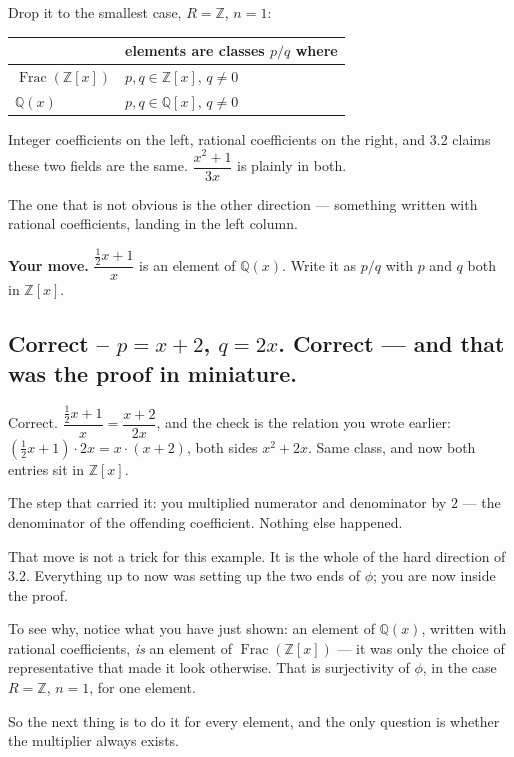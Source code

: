 \documentclass[11pt]{article}
\begin{document}
Drop it to the smallest case, $R = \mathbb{Z}$, $n = 1$:

\begin{center}\begin{tabular}{ll}\hline
\textbf{} & \textbf{elements are classes $p/q$ where} \\ \hline
$\operatorname{Frac}(\mathbb{Z}[x])$ & $p, q \in \mathbb{Z}[x]$, $q \neq 0$ \\
$\mathbb{Q}(x)$ & $p, q \in \mathbb{Q}[x]$, $q \neq 0$ \\
\hline\end{tabular}\end{center}

Integer coefficients on the left, rational coefficients on the right, and 3.2 claims these two fields are the same. $\dfrac{x^2+1}{3x}$ is plainly in both.

The one that is not obvious is the other direction --- something written with rational coefficients, landing in the left column.

\textbf{Your move.} $\dfrac{\tfrac{1}{2}x + 1}{x}$ is an element of $\mathbb{Q}(x)$. Write it as $p/q$ with $p$ and $q$ both in $\mathbb{Z}[x]$.


\subsection*{Correct -- $p = x+2$, $q = 2x$. Correct --- and that was the proof in miniature.}
Correct. $\dfrac{\tfrac12 x + 1}{x} = \dfrac{x+2}{2x}$, and the check is the relation you wrote earlier: $(\tfrac12 x + 1)\cdot 2x = x \cdot (x+2)$, both sides $x^2 + 2x$. Same class, and now both entries sit in $\mathbb{Z}[x]$.

The step that carried it: you multiplied numerator and denominator by $2$ --- the denominator of the offending coefficient. Nothing else happened.

That move is not a trick for this example. It is the whole of the hard direction of 3.2. Everything up to now was setting up the two ends of $\phi$; you are now inside the proof.

To see why, notice what you have just shown: an element of $\mathbb{Q}(x)$, written with rational coefficients, \emph{is} an element of $\operatorname{Frac}(\mathbb{Z}[x])$ --- it was only the choice of representative that made it look otherwise. That is surjectivity of $\phi$, in the case $R = \mathbb{Z}$, $n = 1$, for one element.

So the next thing is to do it for every element, and the only question is whether the multiplier always exists.
\end{document}
